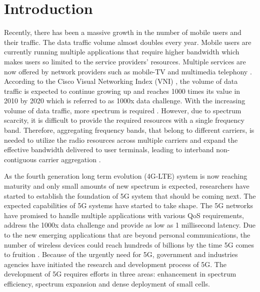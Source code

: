 \documentclass[journal]{IEEEtran} 				\IEEEoverridecommandlockouts 						\usepackage{amsmath,amssymb}
\begin{document}
\section{Introduction}\label{sec:intro}
Recently, there has been a massive growth in the number of mobile users and their traffic. The data traffic volume almost doubles every year. Mobile users are currently running multiple applications that require higher bandwidth which makes users so limited to the service providers' resources. Multiple services  are now offered by network providers such as mobile-TV and multimedia telephony \cite{QoS_3GPP}. According to the Cisco Visual Networking Index (VNI) \cite{Visual-Networking}, the volume of data traffic is expected to continue growing up and reaches 1000 times its value in 2010 by 2020 which is referred to as 1000x data challenge. With the increasing volume of data traffic, more spectrum is required \cite{Carrier_Agg_1}. However, due to spectrum scarcity, it is difficult to provide the required resources with a single frequency band. Therefore, aggregating frequency bands, that belong to different carriers, is needed to utilize the radio resources across multiple carriers and expand the effective bandwidth delivered to user terminals, leading to interband non-contiguous carrier aggregation \cite{Carrier_Agg_2}.


As the fourth generation long term evolution (4G-LTE) system is now reaching maturity and only small amounts of new spectrum is expected, researchers have started to establish the foundation of 5G system that should be coming next. The expected capabilities of 5G systems have started to take shape. The 5G networks have promised to handle multiple applications with various QoS requirements, address the 1000x data challenge and provide as low as 1 millisecond latency. Due to the new emerging applications that are beyond personal communications, the number of wireless devices could reach hundreds of billions by the time 5G comes to fruition \cite{The-challenges,proximity-aware}. Because of the urgently need for 5G, government and industries agencies have initiated the research and development process of 5G. The development of 5G requires efforts in three areas: enhancement in spectrum efficiency, spectrum expansion and dense deployment of small cells.
\end{document}
